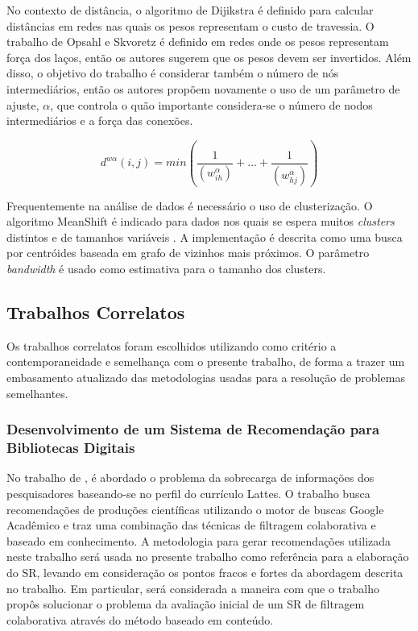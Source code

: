 \documentclass[12pt]{article}
\begin{document}
No contexto de distância, o algoritmo de Dijikstra \cite{dijkstra1959note} é definido para calcular distâncias em redes nas quais os pesos representam o custo de travessia. O trabalho de Opsahl e Skvoretz \cite{opsahl2010node} é definido em redes onde os pesos representam força dos laços, então os autores sugerem que os pesos devem ser invertidos. Além disso, o objetivo do trabalho é considerar também o número de nós intermediários, então os autores propõem novamente o uso de um parâmetro de ajuste, $\alpha$, que controla o quão importante considera-se o número de nodos intermediários e a força das conexões.

\begin{equation} \label{eqn:distance}
  d^{w\alpha}(i, j) = min \left( \frac{1}{ \left( w_{ih}^{\alpha} \right) } + \dots + \frac{1}{ \left( w_{hj}^{\alpha} \right) }  \right) 
\end{equation}

Frequentemente na análise de dados é necessário o uso de clusterização. O algoritmo MeanShift é indicado para dados nos quais se espera muitos \textit{clusters} distintos e de tamanhos variáveis \cite{scikit-learn}. A implementação é descrita como uma busca por centróides baseada em grafo de vizinhos mais próximos. O parâmetro \textit{bandwidth} é usado como estimativa para o tamanho dos clusters.

\subsection{Trabalhos Correlatos}

Os trabalhos correlatos foram escolhidos utilizando como critério a contemporaneidade e semelhança com o presente trabalho, 
de forma a trazer um embasamento atualizado das metodologias usadas para a resolução de problemas semelhantes.

\subsubsection{Desenvolvimento de um Sistema de Recomendação para Bibliotecas Digitais}

No trabalho de \cite{da2018desenvolvimento}, é abordado o problema da sobrecarga de informações dos pesquisadores baseando-se no perfil do currículo Lattes. 
O trabalho busca recomendações de produções científicas utilizando o motor de buscas Google Acadêmico e traz uma combinação 
das técnicas de filtragem colaborativa e baseado em conhecimento. A metodologia para gerar recomendações utilizada neste 
trabalho será usada no presente trabalho como referência para a elaboração do SR, levando em consideração os pontos fracos 
e fortes da abordagem descrita no trabalho. Em particular, será considerada a maneira com que o trabalho propôs solucionar 
o problema  da avaliação inicial de um SR de filtragem colaborativa através do método baseado em conteúdo.
\end{document}
